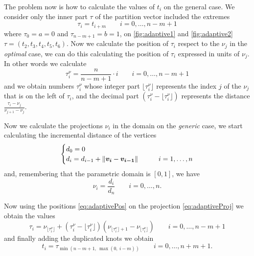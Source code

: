 \documentclass[dissertation.tex]{subfiles}
\begin{document}
The problem now is how to calculate the values of $t_i$ on the general
case. We consider only the inner part $\tau$ of the partition vector
included the extremes
\begin{equation*}
  \tau_i = t_{i+m}\qquad i=0,\dots,n-m+1
\end{equation*}
where $\tau_0=a=0$ and $\tau_{n-m+1}=b=1$, on \cref{fig:adaptive1} and
\cref{fig:adaptive2}
$\tau=(t_2,t_3,t_4,t_5,t_6)$. Now we calculate the position of
$\tau_i$ respect to the $\nu_j$ in the \emph{optimal} case, we can do this
calculating the position of $\tau_i$ expressed in units of $\nu_j$. In
other words we calculate
\begin{equation}\label{eq:adaptivePos}
  \tau_i^\nu=\frac{n}{n-m+1}\cdot i\qquad i=0,\dots,n-m+1
\end{equation}
and we obtain numbers $\tau_i^\nu$ whose integer part
$\lfloor\tau_i^\nu\rfloor$ represents the index $j$ of the
$\nu_j$ that is on the left of $\tau_i$, and the decimal part
$(\tau_i^\nu-\lfloor\tau_i^\nu\rfloor)$ represents the distance
$\frac{\tau_i-\nu_j}{\nu_{j+1}-\nu_j}$.

Now we calculate the projections $\nu_i$ in the domain on the
\emph{generic} case,
we start calculating the incremental distance of
the vertices
\begin{equation*}
  \begin{cases}
    d_0=0&\\
    d_i=d_{i-1}+\left\lVert\boldsymbol{v_i}-\boldsymbol{v_{i-1}}\right\rVert&\qquad i=1,\dots,n
  \end{cases}
\end{equation*}
and, remembering that the parametric domain is $[0,1]$, we have
\begin{equation}\label{eq:adaptiveProj}
  \nu_i=\frac{d_i}{d_n}\qquad i=0,\dots,n.
\end{equation}

Now using the positions \cref{eq:adaptivePos} on the projection
\cref{eq:adaptiveProj} we obtain the values
\begin{equation*}
  \tau_i=\nu_{\lfloor\tau_i^\nu\rfloor}+(\tau_i^\nu-\lfloor\tau_i^\nu\rfloor)(\nu_{\lfloor\tau_i^\nu\rfloor+1}-\nu_{\lfloor\tau_i^\nu\rfloor})\qquad i=0,\dots,n-m+1
\end{equation*}
and finally adding the duplicated knots we obtain
\begin{equation*}
  t_i=\tau_{\min(n-m+1,\ \max(0,\ i-m))}\qquad i=0,\dots,n+m+1.
\end{equation*}
\end{document}
